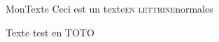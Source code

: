 \documentclass[%
fontsize=10%
,a6paper%
,DIV=15%
]{scrartcl}
\title{\centrer{Grandes Antiennes de l'Avent}}
\author{ou Antiennes O}
\date{du 17 au 23 décembre}
\begin{document}
    \newfontfamily{}
    \def\gretextformat#1{{\fontsize{\taillepolice}{\taillepolice}\selectfont #1}}
    \def\greinitialformat#1{{\lettrines #1}}
    

\newcommand{\ligne}[2]{
\begin{center}
\greseparator{#1}{#2}
\end{center}
}
\newcommand{\marubrique}{\rubrica{Magnificat page \pageref{section:magnificat}. Verset et oraisons page \pageref{section:oraisons}}}



\newfontfamily{}
\renewcommand{\LettrineFontHook}{\malettrine\color{black}}


\newcommand{\toto}[1]
   {{\selectfont #1}}
\toto{MonTexte}
\lettrine{Ceci est un texte}{en lettrine}{normales}

{\fontencoding{\encodingdefault}
\fontseries{\seriesdefault}
\fontshape{\shapedefault}
\selectfont
Texte test en TOTO}
\end{document}
